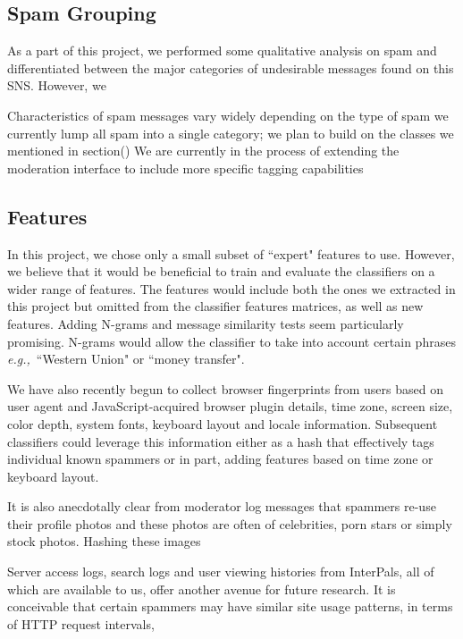 \documentclass[preprint]{acm_proc_article-sp}
\newcommand{\eg}{{\em e.g.,}~}
\begin{document}
\begin{tabular}
{\subsection{Spam Grouping}

As a part of this project, we performed some qualitative analysis on spam and differentiated between the major categories of undesirable messages found on this SNS. However, we 

Characteristics of spam messages vary widely depending on the type of spam
we currently lump all spam into a single category; we plan to build on the classes we mentioned in section()
We are currently in the process of extending the moderation interface to include more specific tagging capabilities


\subsection{Features}

In this project, we chose only a small subset of ``expert" features to use. However, we believe that it would be beneficial to train and evaluate the classifiers on a wider range of features. The features would include both the ones we extracted in this project but omitted from the classifier features matrices, as well as new features. Adding N-grams and message similarity tests seem particularly promising. N-grams would allow the classifier to take into account certain phrases \eg{``Western Union" or ``money transfer"}. 

We have also recently begun to collect browser fingerprints from users based on user agent and JavaScript-acquired browser plugin details, time zone, screen size, color depth, system fonts, keyboard layout and locale information. Subsequent classifiers could leverage this information either as a hash that effectively tags individual known spammers or in part, adding features based on time zone or keyboard layout.

It is also anecdotally clear from moderator log messages that spammers re-use their profile photos and these photos are often of celebrities, porn stars or simply stock photos. Hashing these images 


Server access logs, search logs and user viewing histories from InterPals, all of which are available to us, offer another avenue for future research. It is conceivable that certain spammers may have similar site usage patterns, in terms of HTTP request intervals, 


}
\end{tabular}
\end{document}
